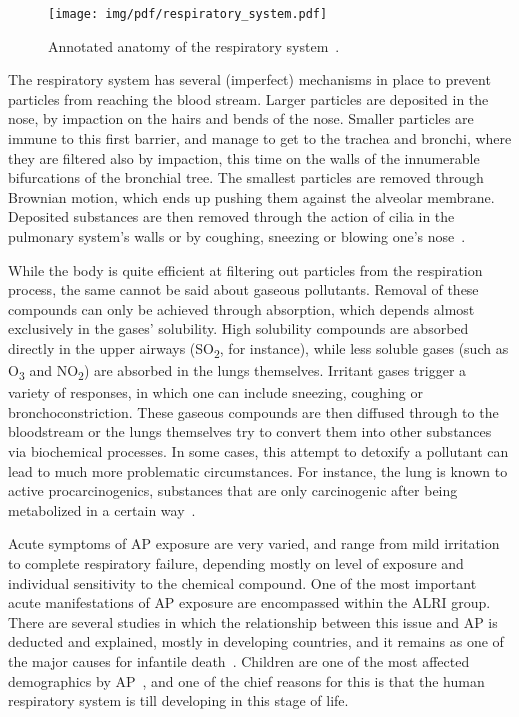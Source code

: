 \begin{figure}[htpb]
    \centering
    \texttt{[image: img/pdf/respiratory\_system.pdf]}
    \caption{Annotated anatomy of the respiratory
    system~\cite{Vallero2014}.}
    \label{fig:respiratory_system}
\end{figure}

The respiratory system has several (imperfect) mechanisms in place to
prevent particles from reaching the blood stream. Larger particles are
deposited in the nose, by impaction on the hairs and bends of the nose.
Smaller particles are immune to this first barrier, and manage to get to
the trachea and bronchi, where they are filtered also by impaction, this
time on the walls of the innumerable bifurcations of the bronchial tree.
The smallest particles are removed through Brownian motion, which ends
up pushing them against the alveolar membrane. Deposited substances are
then removed through the action of cilia in the pulmonary system's walls
or by coughing, sneezing or blowing one's nose~\cite{Vallero2014}.

While the body is quite efficient at filtering out particles from the
respiration process, the same cannot be said about gaseous pollutants.
Removal of these compounds can only be achieved through absorption,
which depends almost exclusively in the gases' solubility. High
solubility compounds are absorbed directly in the upper airways
(SO\textsubscript{2}, for instance), while less soluble gases (such as
O\textsubscript{3} and NO\textsubscript{2}) are absorbed in the lungs
themselves. Irritant gases trigger a variety of responses, in which one
can include sneezing, coughing or bronchoconstriction. These gaseous
compounds are then diffused through to the bloodstream or the lungs
themselves try to convert them into other substances via biochemical
processes. In some cases, this attempt to detoxify a pollutant can lead
to much more problematic circumstances. For instance, the lung is known
to active procarcinogenics, substances that are only carcinogenic after
being metabolized in a certain way~\cite{Vallero2014}.

Acute symptoms of \gls{AP} exposure are very varied, and range from mild
irritation to complete respiratory failure, depending mostly on level of
exposure and individual sensitivity to the chemical compound. One of the
most important acute manifestations of \gls{AP} exposure are encompassed
within the \gls{ALRI} group. There are several studies in which the
relationship between this issue and \gls{AP} is deducted and explained,
mostly in developing countries, and it remains as one of the major
causes for infantile death~\cite{CABI2019, UNICEF2013}. Children are one
of the most affected demographics by \gls{AP}~\cite{EEA2016}, and one of
the chief reasons for this is that the human respiratory system is till
developing in this stage of life.

